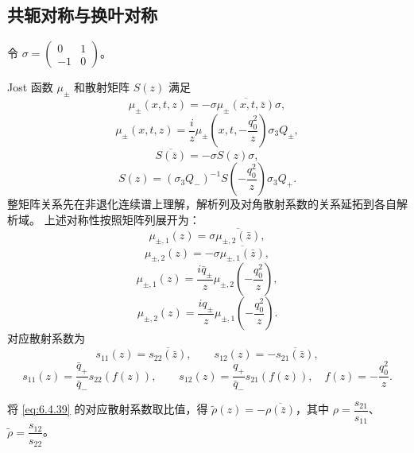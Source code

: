 \documentclass[lang=cn,scheme=chinese,mode=simple,device=normal,color=blue,
math=cm,thmcnt=section,12pt]{elegantbook}
\newcommand{\conj}[1]{\overline{#1}}
\newcommand{\eqq}[2]{\tag{#1}\label{eq:#1}#2}
\begin{document}
\subsection{共轭对称与换叶对称}
令 $\sigma=\begin{pmatrix}0&1\\-1&0\end{pmatrix}$。
\setcounter{theorem}{1}
\begin{theorem}[共轭对称与换叶对称]
    Jost 函数 $\mu_\pm$ 和散射矩阵 $S(z)$ 满足
    \[
        \mu_\pm(x,t,z)=-\sigma\overline{\mu_\pm(x,t,\bar z)}\sigma,
    \]
    \[
        \mu_\pm(x,t,z)=\dfrac{i}{z}\mu_\pm\!\left(x,t,-\dfrac{q_0^2}{z}\right)\sigma_3Q_\pm,
    \]
    \[
        \overline{S(\bar z)}=-\sigma S(z)\sigma,
    \]
    \[
        S(z)=(\sigma_3Q_-)^{-1}S\!\left(-\dfrac{q_0^2}{z}\right)\sigma_3Q_+.
    \]
    整矩阵关系先在非退化连续谱上理解，解析列及对角散射系数的关系延拓到各自解析域。
    上述对称性按照矩阵列展开为：
    \begin{equation}\eqq{6.4.35}{\mu_{\pm,1}(z)=\sigma\conj{\mu_{\pm,2}(\bar z)},}\end{equation}
    \begin{equation}\eqq{6.4.36}{\mu_{\pm,2}(z)=-\sigma\conj{\mu_{\pm,1}(\bar z)},}\end{equation}
    \begin{equation}\eqq{6.4.37}{\mu_{\pm,1}(z)=\dfrac{i\bar q_\pm}{z}\mu_{\pm,2}\!\left(-\dfrac{q_0^2}{z}\right),}\end{equation}
    \begin{equation}\eqq{6.4.38}{\mu_{\pm,2}(z)=\dfrac{iq_\pm}{z}\mu_{\pm,1}\!\left(-\dfrac{q_0^2}{z}\right).}\end{equation}
    对应散射系数为
    \begin{equation}\eqq{6.4.39}{s_{11}(z)=\conj{s_{22}(\bar z)},\qquad s_{12}(z)=-\conj{s_{21}(\bar z)},}\end{equation}
    \begin{equation}\eqq{6.4.40}{s_{11}(z)=\dfrac{\bar q_+}{\bar q_-}s_{22}(f(z)),\qquad
            s_{12}(z)=\dfrac{q_+}{\bar q_-}s_{21}(f(z)),\quad f(z)=-\dfrac{q_0^2}{z}.}\end{equation}
\end{theorem}

将 \eqref{eq:6.4.39} 的对应散射系数取比值，得 $\widetilde\rho(z)=-\conj{\rho(\bar z)}$，其中
$\rho=\dfrac{s_{21}}{s_{11}}$、$\widetilde\rho=\dfrac{s_{12}}{s_{22}}$。
\end{document}
